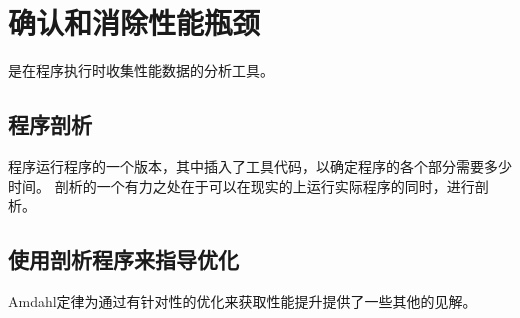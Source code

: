 
\section{确认和消除性能瓶颈}
{
    是在程序执行时收集性能数据的分析工具。

    \subsection{程序剖析}
    {
        程序运行程序的一个版本，其中插入了工具代码，以确定程序的各个部分需要多少时间。
        剖析的一个有力之处在于可以在现实的上运行实际程序的同时，进行剖析。
    }

    \subsection{使用剖析程序来指导优化}
    {
        Amdahl定律为通过有针对性的优化来获取性能提升提供了一些其他的见解。
    }
}
